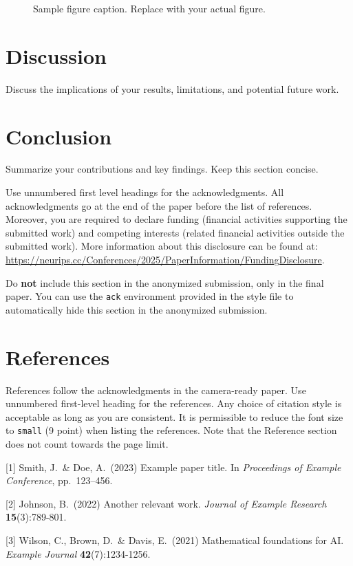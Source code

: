 \documentclass{article}
\begin{document}
\begin{figure}[h]
  \centering
  \fbox{\rule[-.5cm]{0cm}{4cm} \rule[-.5cm]{4cm}{0cm}}
  \caption{Sample figure caption. Replace with your actual figure.}
  \label{fig:sample}
\end{figure}

\section{Discussion}

Discuss the implications of your results, limitations, and potential future work.

\section{Conclusion}

Summarize your contributions and key findings. Keep this section concise.

\begin{ack}
Use unnumbered first level headings for the acknowledgments. All acknowledgments
go at the end of the paper before the list of references. Moreover, you are required to declare
funding (financial activities supporting the submitted work) and competing interests (related financial activities outside the submitted work).
More information about this disclosure can be found at: \url{https://neurips.cc/Conferences/2025/PaperInformation/FundingDisclosure}.

Do {\bf not} include this section in the anonymized submission, only in the final paper. You can use the \texttt{ack} environment provided in the style file to automatically hide this section in the anonymized submission.
\end{ack}

\section*{References}

References follow the acknowledgments in the camera-ready paper. Use unnumbered first-level heading for
the references. Any choice of citation style is acceptable as long as you are
consistent. It is permissible to reduce the font size to \verb+small+ (9 point)
when listing the references.
Note that the Reference section does not count towards the page limit.
\medskip

{
\small

[1] Smith, J.\ \& Doe, A.\ (2023) Example paper title. In {\it Proceedings of Example Conference}, pp.\ 123--456.

[2] Johnson, B.\ (2022) Another relevant work. {\it Journal of Example Research} {\bf 15}(3):789-801.

[3] Wilson, C., Brown, D.\ \& Davis, E.\ (2021) Mathematical foundations for AI. {\it Example Journal} {\bf 42}(7):1234-1256.

}
\end{document}
